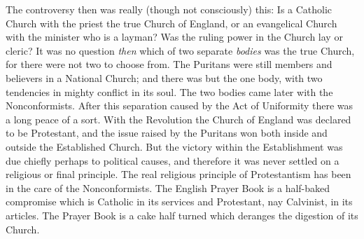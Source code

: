 \documentclass[12pt,a5paper,twoside]{book}
\begin{document}
The controversy then was really (though not consciously) 
this: Is a Catholic Church with the priest 
the true Church of England, or an evangelical Church 
with the minister who is a layman? Was the ruling 
power in the Church lay or cleric? It was no question 
\textit{then} which of two separate \textit{bodies} was the true 
Church, for there were not two to choose from. 
The Puritans were still members and believers in a 
National Church; and there was but the one body, 
with two tendencies in mighty conflict in its soul. 
The two bodies came later with the Nonconformists. 
After this separation caused by the Act of Uniformity 
there was a long peace of a sort. With the Revolution 
the Church of England was declared to be Protestant, 
and the issue raised by the Puritans won both 
inside and outside the Established Church. But the 
victory within the Establishment was due chiefly perhaps 
to political causes, and therefore it was never 
settled on a religious or final principle. The real 
religious principle of Protestantism has been in the 
care of the Nonconformists. The English Prayer 
Book is a half-baked compromise which is Catholic in 
its services and Protestant, nay Calvinist, in its articles. 
The Prayer Book is a cake half turned which deranges 
the digestion of its Church. 
\end{document}
